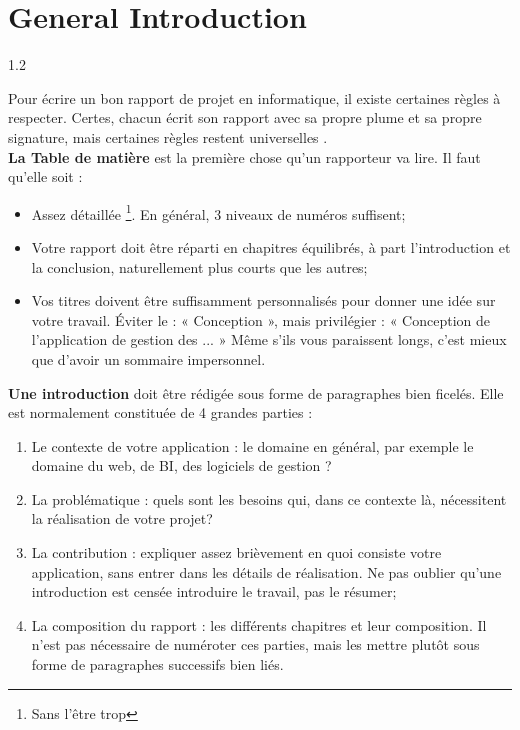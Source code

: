 \chapter*{General Introduction}

\begin{spacing}{1.2}

Pour écrire un bon rapport \cite{SFAXI2015} de projet en informatique, il existe certaines règles à respecter. Certes, chacun écrit son rapport avec sa propre plume et sa propre signature, mais certaines règles restent universelles    \cite{Latex}.\\

\textbf{La Table de matière} est la première chose qu'un rapporteur va lire. Il faut qu'elle soit :
\begin{itemize}
\item Assez détaillée \footnote{Sans l'être trop}. En général, 3 niveaux de numéros suffisent;
\item Votre rapport doit être réparti en chapitres équilibrés, à part l'introduction et la conclusion, naturellement plus courts que les autres;
\item Vos titres doivent être suffisamment personnalisés pour donner une idée sur votre travail. Éviter le : « Conception »,  mais privilégier : « Conception de l'application de gestion des $...$ » Même s'ils vous paraissent longs, c'est mieux que 
d'avoir un sommaire impersonnel. \\
\end{itemize}

\textbf{Une introduction} doit être rédigée sous forme de paragraphes bien ficelés. Elle est
normalement constituée de 4 grandes parties :
\begin{enumerate}
\item Le contexte de votre application : le domaine en général, par exemple le domaine du web, de BI, des logiciels de gestion ?
\item La problématique : quels sont les besoins qui, dans ce contexte là, nécessitent la réalisation de votre projet?
\item La contribution : expliquer assez brièvement en quoi consiste votre application, sans entrer dans les détails de réalisation. Ne pas oublier qu'une introduction est
 censée introduire le travail, pas le résumer; 
 \item La composition du rapport : les différents chapitres et leur composition. Il n'est pas nécessaire de numéroter ces parties, mais les mettre plutôt sous forme de paragraphes successifs bien liés.
\end{enumerate}






\end{spacing}


